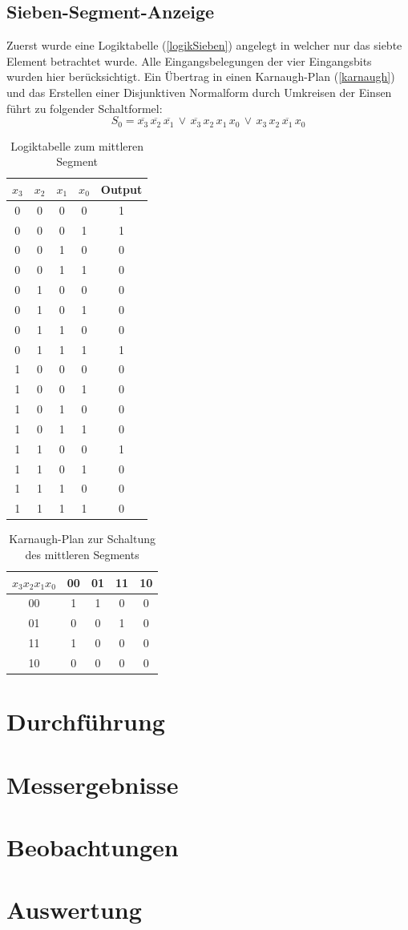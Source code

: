 \documentclass[11pt, a4paper]{article}
\begin{document}
\subsection*{Sieben-Segment-Anzeige}
Zuerst wurde eine Logiktabelle (\autoref{logikSieben}) angelegt in welcher nur das siebte Element betrachtet wurde. Alle Eingangsbelegungen der vier Eingangsbits wurden hier berücksichtigt. Ein Übertrag in einen Karnaugh-Plan (\autoref{karnaugh}) und das Erstellen einer Disjunktiven Normalform durch Umkreisen der Einsen führt zu folgender Schaltformel:
$$S_0 = \overline{x_3}\,\overline{x_2}\,\overline{x_1}\,\lor\,\overline{x_3}\,x_2\,x_1\,x_0\,\lor\,x_3\,x_2\,\overline{x_1}\,x_0$$
\begin{table}[H]
	\center
	\begin{tabular}{c|c|c|c||c}
	$x_3$ &  $x_2$ & $x_1$ & $x_0$ & Output	\\ \hline
	0 & 0 & 0 & 0 & 1 \\ \hline	
	0 & 0 & 0 & 1 & 1 \\ \hline
	0 & 0 & 1 & 0 & 0 \\ \hline
	0 & 0 & 1 & 1 & 0 \\ \hline
	0 & 1 & 0 & 0 & 0 \\ \hline
	0 & 1 & 0 & 1 & 0 \\ \hline
	0 & 1 & 1 & 0 & 0 \\ \hline
	0 & 1 & 1 & 1 & 1 \\ \hline
	1 & 0 & 0 & 0 & 0 \\ \hline	
	1 & 0 & 0 & 1 & 0 \\ \hline	
	1 & 0 & 1 & 0 & 0 \\ \hline	
	1 & 0 & 1 & 1 & 0 \\ \hline	
	1 & 1 & 0 & 0 & 1 \\ \hline	
	1 & 1 & 0 & 1 & 0 \\ \hline	
	1 & 1 & 1 & 0 & 0 \\ \hline	
	1 & 1 & 1 & 1 & 0 \\ \hline	
	\end{tabular}
	\caption{Logiktabelle zum mittleren Segment}
	\label{logikSieben}
\end{table}
\begin{table}[H]
	\center
	\begin{tabular}{c||c|c|c|c}
	$x_3 x_2 x_1 x_0$ 	& 00 & 01 & 11 & 10	\\ \hline \hline
	00 & 1 & 1 & 0 & 0 \\ \hline
	01 & 0 & 0 & 1 & 0 \\ \hline
	11 & 1 & 0 & 0 & 0 \\ \hline
	10 & 0 & 0 & 0 & 0 \\ \hline
	\end{tabular}
	\caption{Karnaugh-Plan zur Schaltung des mittleren Segments}
	\label{karnaugh}
\end{table}
\section*{Durchführung}
\section*{Messergebnisse}
\section*{Beobachtungen}
\section*{Auswertung}
\end{document}
